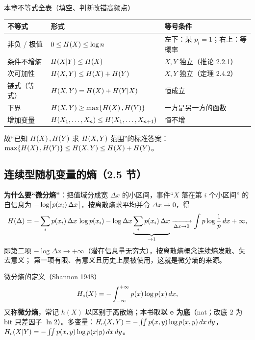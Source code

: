 \begin{keypoint}{本章不等式全表（填空、判断改错高频点）}
\begin{center}
\renewcommand{\arraystretch}{1.22}
\begin{tabular}{lll}
\toprule
不等式 & 形式 & 等号条件 \\
\midrule
非负 / 极值 & $0\le H\!\left(X\right)\le\log n$ & 左下：某 $p_i=1$；右上：等概率 \\
条件不增熵 & $H\!\left(X|Y\right)\le H\!\left(X\right)$ & $X,Y$ 独立（推论 2.2.1）\\
次可加性 & $H\!\left(X,Y\right)\le H\!\left(X\right)+H\!\left(Y\right)$ & $X,Y$ 独立（定理 2.4.2）\\
链式（等式）& $H\!\left(X,Y\right)=H\!\left(X\right)+H\!\left(Y|X\right)$ & 恒成立 \\
下界 & $H\!\left(X,Y\right)\ge\max\{H\!\left(X\right),H\!\left(Y\right)\}$ & 一方是另一方的函数 \\
增加变量 & $H\!\left(X_1,\dots,X_n\right)\le H\!\left(X_1,\dots,X_{n+1}\right)$ & 恒不增 \\
\bottomrule
\end{tabular}
\end{center}
故“已知 $H\!\left(X\right),H\!\left(Y\right)$ 求 $H\!\left(X,Y\right)$ 范围”的标准答案：
$\max\{H\!\left(X\right),H\!\left(Y\right)\}\le H\!\left(X,Y\right)\le H\!\left(X\right)+H\!\left(Y\right)$。
\end{keypoint}

\subsection{连续型随机变量的熵（2.5 节）}

\textbf{为什么要“微分熵”}：把值域分成宽 $\Delta x$ 的小区间，事件“$X$ 落在第 $i$ 个小区间”
的自信息为 $-\log\bigl[p\!\left(x_i\right)\Delta x\bigr]$，按离散熵求平均并令 $\Delta x\to0$，得
\[
H\!\left(\Delta\right)=-\sum_ip\!\left(x_i\right)\Delta x\,\log p\!\left(x_i\right)
-\log\Delta x\underbrace{\sum_ip\!\left(x_i\right)\Delta x}_{\to1}
\xrightarrow[\Delta x\to0]{}
\int p\log\frac{1}{p}\,dx+\infty ,
\]
即第二项 $-\log\Delta x\to+\infty$（潜在信息量无穷大），按离散熵概念连续熵发散、失去意义；
第一项有限、有意义且历史上屡被使用，这就是微分熵的来源。

\begin{defbox}{微分熵的定义（Shannon 1948）}
\[
H_{c}\!\left(X\right)=-\int_{-\infty}^{+\infty}p(x)\log p(x)\,dx ,
\]
又称\textbf{微分熵}，常记 $h(X)$ 以区别于离散熵；本书取\textbf{以 e 为底}（nat；改底 $2$
为 bit 只差因子 $\ln2$）。多变量：$H_{c}\!\left(X,Y\right)=-\iint p(x,y)\log p(x,y)\,dx\,dy$，
$H_{c}\!\left(X|Y\right)=-\iint p(x,y)\log p(x|y)\,dx\,dy$。
\end{defbox}

